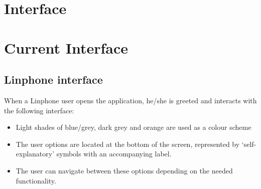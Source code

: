 \documentclass[11pt]{article}
\begin{document}
\setcounter{tocdepth}{3}
\setcounter{secnumdepth}{5}
\tableofcontents

\newpage
\section{Interface}


\section{Current Interface}
\subsection{Linphone interface}
When a Linphone user opens the application, he/she is greeted and interacts with the following interface:
\begin{itemize}
\item	Light shades of blue/grey, dark grey and orange are used as a colour scheme
\item	The user options are located at the bottom of the screen, represented by ‘self-explanatory’ symbols with an accompanying label.
\item	The user can navigate between these options depending on the needed functionality.
\end{itemize}
\end{document}
